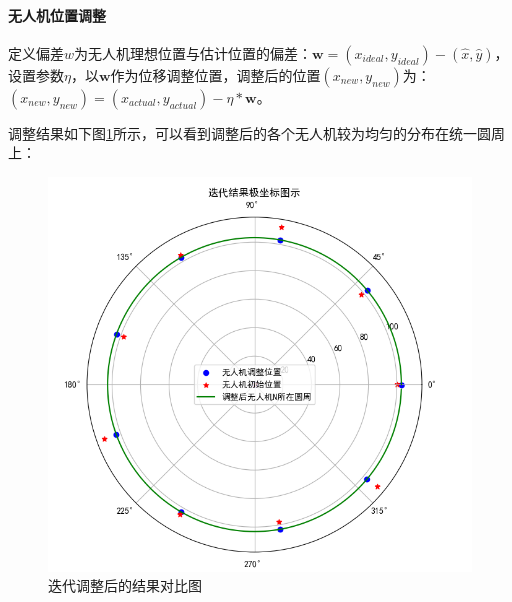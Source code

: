 \documentclass[withoutpreface,bwprint]{cumcmthesis} %
\begin{document}
			\paragraph{无人机位置调整}
			定义偏差$w$为无人机理想位置与估计位置的偏差：$\boldsymbol{w}=(x_{ideal},y_{ideal}) - (\hat{x},\hat{y})$，设置参数$\eta{}$，以$\boldsymbol{w}$作为位移调整位置，调整后的位置$(x_{new},y_{new})$为：$(x_{new},y_{new})= (x_{actual},y_{actual}) - \eta{} * \boldsymbol{w}$。
			\par 调整结果如下图\ref{Polar}所示，可以看到调整后的各个无人机较为均匀的分布在统一圆周上：
			\begin{figure}[H]
				\centering
				\includegraphics[width=0.35\linewidth]{./figures/Polar Axis}
				\caption{迭代调整后的结果对比图}
				\label{Polar}
			\end{figure}
	
		
\end{document}
